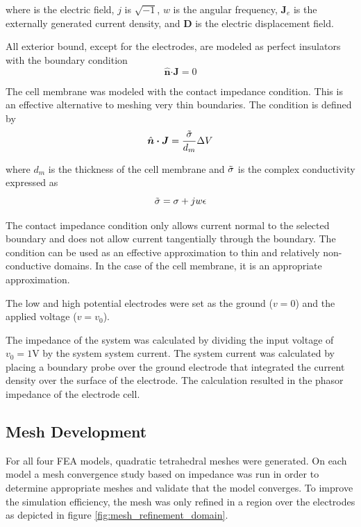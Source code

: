 where \boldsymbol\E is the electric field, $j$ is $\sqrt{-1}$, $w$ is the angular frequency, $\boldsymbol J_e$ is the externally generated current density, and $\boldsymbol D$ is the electric displacement field. 

\par All exterior bound, except for the electrodes, are modeled as perfect insulators with the boundary condition
\begin{equation}
    \hat{\boldsymbol n} \boldsymbol\cdot \boldsymbol J = 0
\end{equation}

\par The cell membrane was modeled with the contact impedance condition. This is an effective alternative to meshing very thin boundaries. The condition is defined by
\begin{equation}
    \hat{\boldsymbol n} \boldsymbol\cdot \boldsymbol J = \frac{\Tilde{\sigma}}{d_{m}} \Delta V
\end{equation}

where $d_m$ is the thickness of the cell membrane and $\Tilde{\sigma}$ is the complex conductivity expressed as
\begin{equation}
    \Tilde{\sigma} = \sigma + jw\epsilon 
\end{equation}

\par The contact impedance condition only allows current normal to the selected boundary and does not allow current tangentially through the boundary. The condition can be used as an effective approximation to thin and relatively non-conductive domains. In the case of the cell membrane, it is an appropriate approximation. 

\par The low and high potential electrodes were set as the ground ($v=0$) and the applied voltage ($v=v_0$).

\par The impedance of the system was calculated by dividing the input voltage of $v_0 = 1$V by the system system current. The system current was calculated by placing a boundary probe over the ground electrode that integrated the current density over the surface of the electrode. The calculation resulted in the phasor impedance of the electrode cell. 

\subsection{Mesh Development}
\par For all four FEA models, quadratic tetrahedral meshes were generated. On each model a mesh convergence study based on impedance was run in order to determine appropriate meshes and validate that the model converges. To improve the simulation efficiency, the mesh was only refined in a region over the electrodes as depicted in figure \ref{fig:mesh_refinement_domain}.

